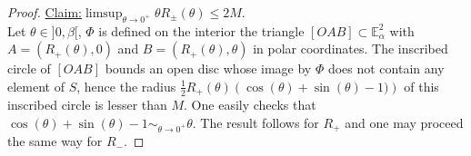 \documentclass[a4paper,12pt]{article}
\def\E{\mathbf E}
\def\E{\mathbb{E}}
\def\E{\mathbb{E}}
\newenvironment{claim}[1]{\par\noindent\underline{Claim:}\space#1}{}
\theoremstyle{definition}
\begin{document}
\begin{proof}
% 				
% 				 
				\begin{claim}{$\limsup_{\theta\rightarrow 0^+} \theta R_\pm(\theta)\leq 2M$.}
				\end{claim}
				 \\ Let $\theta\in ]0,\beta[$, $\Phi$ is defined on the interior the triangle $[OAB]\subset \E^2_{\alpha}$ with $A=(R_+(\theta),0)$ and $B=(R_+(\theta),\theta)$ in polar coordinates. The inscribed circle of $[OAB]$ bounds an open disc whose image by $\Phi$ does not contain any element of $S$, hence the radius $\frac{1}{2}R_+(\theta)\left(\cos(\theta)+\sin(\theta)-1)\right)$ of this inscribed circle is lesser than $M$. One easily checks that $\cos(\theta)+\sin(\theta)-1\sim_{\theta \rightarrow 0^+} \theta$. The result follows for $R_+$ and one may proceed the same way for $R_-$.


\end{proof}
\end{document}
